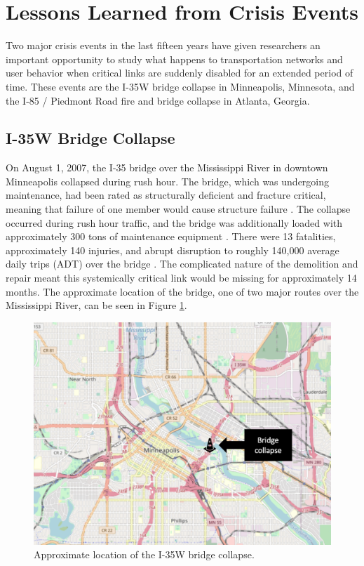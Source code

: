 \section{Lessons Learned from Crisis Events}

Two major crisis events in the last fifteen years have given researchers
an important opportunity
to study what happens to transportation networks and user behavior when critical links are
suddenly disabled for an
extended period of time. These events are the I-35W bridge
collapse in
Minneapolis, Minnesota, and the I-85 / Piedmont Road fire and bridge
collapse in Atlanta, Georgia.

\subsection{I-35W Bridge Collapse}

On August 1, 2007, the I-35 bridge over the Mississippi River in downtown
Minneapolis collapsed
during rush hour. The bridge, which was undergoing maintenance, had been
rated as structurally
deficient and fracture critical, meaning that failure of one member would
cause structure
failure \citep{schaper2017}. The collapse occurred during rush hour traffic, and the bridge
was additionally loaded
with approximately 300 tons of maintenance equipment \citep{schaper2017}.
There were 13
fatalities,
approximately 140 injuries, and abrupt disruption to roughly 140,000
average daily trips (ADT)
over the bridge \citep{zhu2010}. The complicated nature of the demolition
and repair meant
this systemically critical link would be missing for approximately 14
months. The approximate
location of the bridge, one of two major routes over the Mississippi
River, can be seen in Figure \ref{fig:i35}.

\begin{figure}

{\centering \includegraphics[width=0.75\linewidth]{figures/chapter2/I-35W.png}

}

\caption{Approximate location of the I-35W bridge collapse.}\label{fig:i35}
\end{figure}

